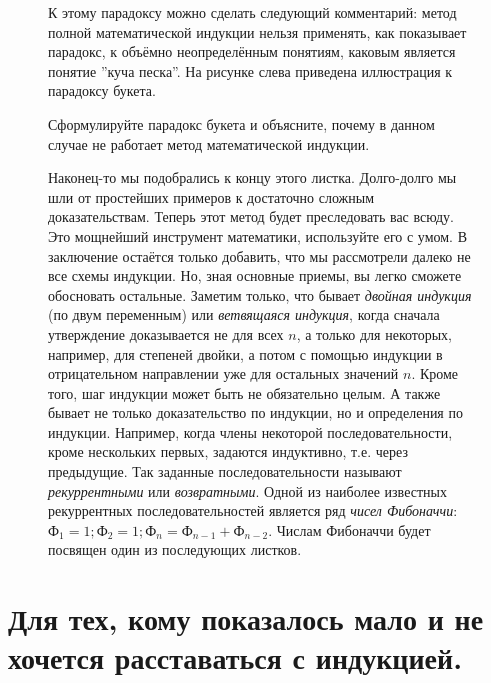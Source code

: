 \begin{figure}[H]
\hfill
\begin{minipage}{0.64\linewidth}\setlength{\parindent}{1.5em}
К этому парадоксу можно сделать следующий комментарий: метод полной математической индукции нельзя применять, как
показывает парадокс, к объёмно неопределённым понятиям,
каковым является понятие ''куча песка''. На рисунке слева
приведена иллюстрация к парадоксу букета.
\par
\begin{ex}
    Сформулируйте парадокс букета и объясните,
почему в данном случае не работает метод математической
индукции.
\end{ex}
Наконец-то мы подобрались к концу этого листка. Долго-долго мы шли от простейших примеров к достаточно сложным доказательствам. Теперь этот метод будет преследовать вас всюду. Это мощнейший инструмент математики, используйте его с умом. В заключение остаётся только добавить, что мы рассмотрели далеко не все схемы индукции. Но, зная основные приемы, вы легко сможете обосновать остальные. Заметим только, что бывает \textit{двойная индукция} (по двум переменным) или \textit{ветвящаяся индукция}, когда сначала утверждение доказывается не для всех $n$, а только для некоторых, например, для степеней двойки, а потом с помощью индукции в отрицательном направлении уже для остальных значений $n$. Кроме того, шаг индукции может быть не обязательно целым. А также бывает не только доказательство по индукции, но и определения по индукции. Например, когда члены некоторой последовательности, кроме нескольких первых, задаются индуктивно, т.е. через предыдущие. Так заданные последовательности называют \textit{рекуррентными} или \textit{возвратными}. Одной из наиболее известных рекуррентных последовательностей является ряд \textit{чисел Фибоначчи}: $Ф_1 = 1; Ф_2 = 1; Ф_n = Ф_{n - 1} + Ф_{n - 2}$. Числам Фибоначчи будет посвящен один из последующих листков.
\end{minipage}
\end{figure}





\section*{Для тех, кому показалось мало и не хочется расставаться с индукцией. \smiley}

